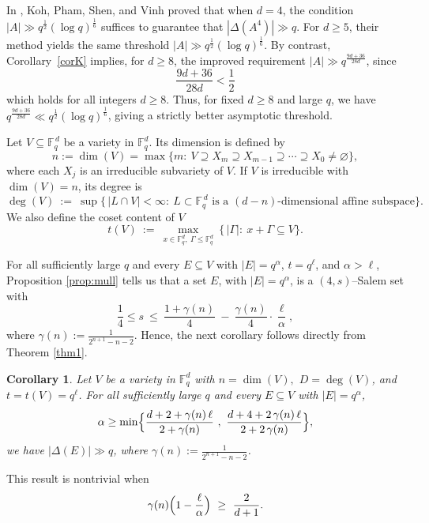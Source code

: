 \documentclass[11pt]{article}
\newtheorem{corollary}[theorem]{Corollary}
\begin{document}
 In \cite{kohkoh}, Koh, Pham, Shen, and Vinh proved that when $d = 4$, the condition $|A| \gg q^{\frac{1}{2}}(\log q)^{\frac{1}{6}}$ suffices to guarantee that $|\Delta(A^4)| \gg q$. For $d \geq 5$, their method yields the same threshold $|A| \gg q^{\frac{1}{2}}(\log q)^{\frac{1}{6}}$. By contrast, Corollary~\ref{corK} implies, for $d \geq 8$, the improved requirement $|A| \gg q^{\frac{9d+36}{28d}}$, since
\[
\frac{9d + 36}{28d} < \frac{1}{2}
\]
which holds for all integers $d \geq 8$. 
Thus, for fixed $d \geq 8$ and large $q$, we have $q^{\frac{9d+36}{28d}} \ll q^{\frac{1}{2}}(\log q)^{\frac{1}{6}}$, giving a strictly better asymptotic threshold.




Let $V\subseteq \mathbb F_q^{\,d}$ be a variety in $\mathbb{F}_q^d$. Its dimension is defined by
\[
  n:=\dim(V)=\max\{m:\ V \supseteq X_m \supseteq X_{m-1} \supseteq \cdots \supseteq X_0 \neq \varnothing\},
\]
where each $X_j$ is an irreducible subvariety of $V$.
If $V$ is irreducible with $\dim(V)=n$, its degree is
\[
  \deg(V)\ :=\ \sup\bigl\{\,|L\cap V|<\infty:\ L\subset\mathbb F_q^{\,d}
  \text{ is a }(d-n)\text{-dimensional affine subspace}\bigr\}.
\]
We also define the coset content of $V$
\[
  t(V)\ :=\ \max_{x\in \mathbb{F}_q^d,\ \Gamma\le \mathbb{F}_q^d}\ \bigl\{\,|\Gamma|:\ x+\Gamma\subseteq V\}.
\]

For all sufficiently large $q$ and every $E\subseteq V$ with $|E|=q^{\alpha}$, $t=q^{\ell}$, and $\alpha>\ell$, Proposition \ref{prop:mull} tells us that a set $E$, with $|E|=q^{\alpha}$, is a $(4, s)$--Salem set with 
\[\frac{1}{4}\le s\ \le\ \frac{1+\gamma(n)}{4}\ -\ \frac{\gamma(n)}{4}\cdot\frac{\ell}{\alpha},\]
where $\gamma(n) := \frac{1}{2^{n+1} - n - 2}$. Hence, the next corollary follows directly from Theorem \ref{thm1}.

\begin{corollary}
Let $V$ be a variety in $\mathbb{F}_q^d$ with
$n=\dim(V),$ $D=\deg(V)$, and $t=t(V)=q^\ell$.
For all sufficiently large $q$ and every $E\subseteq V$ with $|E|=q^\alpha$, \[\alpha\ge \min \Bigl\{\frac{d+2+\gamma(n)\,\ell}{\,2+\gamma(n)\,}\ ,\ \frac{d+4+2\,\gamma(n)\,\ell}{\,2+2\,\gamma(n)\,}\Bigr\}, \] we have $|\Delta(E)|\gg q$, where $\gamma(n) := \frac{1}{2^{n+1} - n - 2}$.
\end{corollary}


This result is nontrivial when 
\begin{equation}\label{eq:overlap-cond}
\gamma(n)\Bigl(1-\frac{\ell}{\alpha}\Bigr)\ \ge\ \frac{2}{d+1}.
\end{equation}
\end{document}
